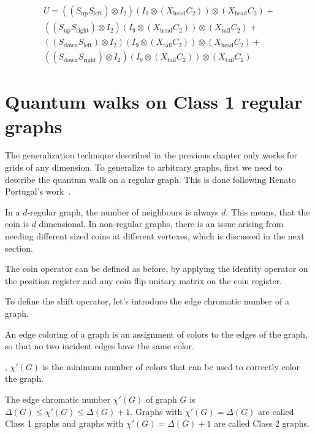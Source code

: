 \begin{align}
   U =
   ((S_{\text{up}}  S_{\text{left}}) \otimes I_2) (I_9 \otimes (X_{\text{head}}C_2)) \otimes (X_{\text{head}}C_2) + \\
   ((S_{\text{up}}  S_{\text{right}}) \otimes I_2) (I_9 \otimes (X_{\text{head}}C_2)) \otimes (X_{\text{tail}}C_2) + \\
   ((S_{\text{down}}  S_{\text{left}}) \otimes I_2) (I_9 \otimes (X_{\text{tail}}C_2)) \otimes (X_{\text{head}}C_2) + \\
   ((S_{\text{down}}  S_{\text{right}}) \otimes I_2) (I_9 \otimes (X_{\text{tail}}C_2)) \otimes (X_{\text{tail}}C_2)
\end{align}

\section{Quantum walks on Class 1 regular graphs}

The generalization technique described in the previous chapter only works for grids of any dimension. To generalize to arbitrary graphs, first we need to describe the quantum walk on a regular graph. This is done following Renato Portugal's work~\cite{Portugal}.

In a $d$-regular graph, the number of neighbours is always $d$. This means, that the coin is $d$ dimensional. In non-regular graphs, there is an issue arising from needing different sized coins at different vertexes, which is discussed in the next section.

The coin operator can be defined as before, by applying the identity operator on the position register and any coin flip unitary matrix on the coin register.

To define the shift operator, let's introduce the edge chromatic number of a graph.



An edge coloring of a graph is an assignment of colors to the edges of the graph, so that no two incident edges have the same color.

, $\chi'(G)$ is the minimum number of colors that can be used to correctly color the graph.


The edge chromatic number $\chi'(G)$ of graph $G$ is $\Delta(G) \leq{} \chi'(G) \leq{} \Delta(G)+1$. Graphs with $\chi'(G) = \Delta(G)$ are called Class 1 graphs and graphs with $\chi'(G) = \Delta(G)+1$ are called Class 2 graphs.

